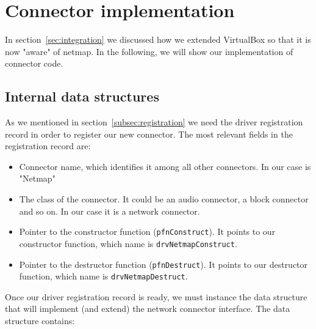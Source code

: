 \documentclass[a4paper, 12pt, titlepage]{report}
\begin{document}
\section{Connector implementation} \label{sec:implementation}
In section~\ref{sec:integration} we discussed how we extended VirtualBox so that it is now "aware" of netmap. In the following, we will show our implementation of connector code.

\subsection{Internal data structures} \label{subsec:structs}
As we mentioned in section~\ref{subsec:registration} we need the driver registration record in order to register our new connector. The most relevant fields in the registration record are:
\begin{itemize}
\item Connector name, which identifies it among all other connectors. In our case is "Netmap"
\item The class of the connector. It could be an audio connector, a block connector and so on. In our case it is a network connector.
\item Pointer to the constructor function (\texttt{pfnConstruct}). It points to our constructor function, which name is \texttt{drvNetmapConstruct}.
\item Pointer to the destructor function (\texttt{pfnDestruct}). It points to our destructor function, which name is \texttt{drvNetmapDestruct}.
\end{itemize}
Once our driver registration record is ready, we must instance the data structure that will implement (and extend) the network connector interface. The data structure contains:
\end{document}
